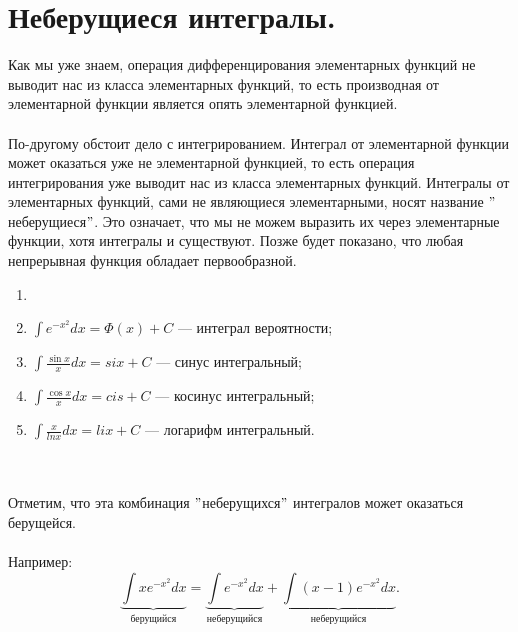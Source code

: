 \section{Неберущиеся интегралы.}
Как мы уже знаем, операция дифференцирования элементарных функций не выводит нас из класса элементарных функций, то есть производная от элементарной функции является опять элементарной функцией.\\\\
По-другому обстоит дело с интегрированием. Интеграл от элементарной функции может оказаться уже не элементарной функцией, то есть операция интегрирования уже выводит нас из класса элементарных функций. Интегралы от элементарных функций, сами не являющиеся элементарными, носят название $"$неберущиеся$"$. Это означает, что мы не можем выразить их через элементарные функции, хотя интегралы и существуют. Позже будет показано, что любая непрерывная функция обладает первообразной. \\
\begin{example}
	\begin{enumerate}
		\item \item $ \int\limits e^{-x^2} dx = \Phi(x) + C $ --- интеграл вероятности;
		\item $ \int\limits \frac{\sin{x}}{x} dx = six + C $ --- синус интегральный;
		\item $ \int\limits \frac{\cos{x}}{x} dx = cis + C $ --- косинус интегральный;
		\item $ \int\limits \frac{x}{lnx} dx = lix + C $ --- логарифм интегральный.
	\end{enumerate}
\end{example}\\\\
Отметим, что эта комбинация $"$неберущихся$"$ интегралов может оказаться берущейся.\\\\
Например:\\
$$\underbrace{\int\limits xe^{-x^2} dx}_{\text{берущийся}} = \underbrace{\int\limits e^{-x^2} dx}_{\text{неберущийся}} + \underbrace{\int\limits (x - 1)e^{-x^2} dx}_{\text{неберущийся}}.$$

